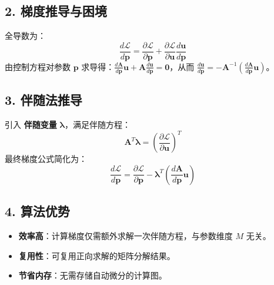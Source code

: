 \documentclass[11pt,a4paper]{article}
\begin{document}
\subsection*{2. 梯度推导与困境}
全导数为：
\begin{equation}
    \frac{d\mathcal{L}}{d\mathbf{p}} = \frac{\partial \mathcal{L}}{\partial \mathbf{p}} + \frac{\partial \mathcal{L}}{\partial \mathbf{u}} \frac{d\mathbf{u}}{d\mathbf{p}}
\end{equation}
由控制方程对参数 $\mathbf{p}$ 求导得：$\frac{d\mathbf{A}}{d\mathbf{p}} \mathbf{u} + \mathbf{A} \frac{d\mathbf{u}}{d\mathbf{p}} = \mathbf{0}$，从而 $\frac{d\mathbf{u}}{d\mathbf{p}} = -\mathbf{A}^{-1} \left( \frac{d\mathbf{A}}{d\mathbf{p}} \mathbf{u} \right)$。

\subsection*{3. 伴随法推导}
引入 \textbf{伴随变量} $\bm{\lambda}$，满足伴随方程：
\begin{equation}
    \mathbf{A}^T \bm{\lambda} = \left( \frac{\partial \mathcal{L}}{\partial \mathbf{u}} \right)^T
\end{equation}
最终梯度公式简化为：
\begin{equation}
    \frac{d\mathcal{L}}{d\mathbf{p}} = \frac{\partial \mathcal{L}}{\partial \mathbf{p}} - \bm{\lambda}^T \left( \frac{d\mathbf{A}}{d\mathbf{p}} \mathbf{u} \right)
\end{equation}

\subsection*{4. 算法优势}
\begin{itemize}
    \item \textbf{效率高}：计算梯度仅需额外求解一次伴随方程，与参数维度 $M$ 无关。
    \item \textbf{复用性}：可复用正向求解的矩阵分解结果。
    \item \textbf{节省内存}：无需存储自动微分的计算图。
\end{itemize}
\end{document}
